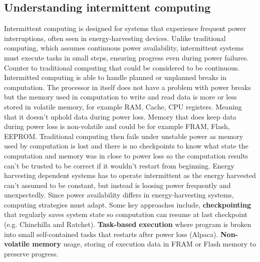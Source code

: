 \documentclass[article,a4paper]{IEEEtran}
\begin{document}
\subsection{Understanding intermittent computing}
Intermittent computing is designed for systems that experience frequent power interruptions, often seen in energy-harvesting devices. Unlike traditional computing, which assumes continuous power availability, intermittent systems must execute tasks in small steps, ensuring progress even during power failures. 
\newline\newline
Counter to traditional computing that could be considered to be continuous. Intermitted computing is able to handle planned or unplanned breaks in computation. The processor in itself does not have a problem with power breaks but the memory used in computation to write and read data is more or less stored in volatile memory, for example RAM, Cache, CPU registers. Meaning that it doesn't uphold data during power loss. Memory that does keep data during power loss is non-volatile and could be for example FRAM, Flash, EEPROM. Traditional computing then fails under unstable power as memory used by computation is lost and there is no checkpoints to know what state the computation and memory was in close to power loss so the computation results can't be trusted to be correct if it wouldn't restart from beginning. Energy harvesting dependent systems has to operate intermittent as the energy harvested can't assumed to be constant, but instead is loosing power frequently and unexpectedly. 
\newline\newline
Since power availability differs in energy-harvesting systems, computing strategies must adapt. Some key approaches include, \textbf{checkpointing} that regularly saves system state so computation can resume at last checkpoint (e.g. Chinchilla and Ratchet). \textbf{Task-based execution} where program is broken into small self-contained tasks that restarts after power loss (Alpaca). \textbf{Non-volatile memory} usage, storing of execution data in FRAM or Flash memory to preserve progress. 
\end{document}

